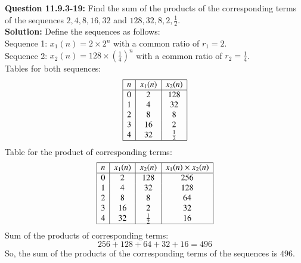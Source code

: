 \documentclass[journal,12pt,twocolumn]{IEEEtran}
\theoremstyle{remark}
\begin{document}
\title{}
\author{Sasa Mardi, EE23BTECH11222}
\date{}
\maketitle
\textbf{Question 11.9.3-19:} Find the sum of the products of the corresponding terms of the sequences $2, 4, 8, 16, 32$ and $128, 32, 8, 2, \frac{1}{2}$.\\
\textbf{Solution:}
Define the sequences as follows:\\
Sequence 1: \( x_1(n) = 2 \times 2^n \) with a common ratio of \( r_1 = 2 \).\\
Sequence 2: \( x_2(n) = 128 \times \left(\frac{1}{4}\right)^n \) with a common ratio of \( r_2 = \frac{1}{4}\).\\
Tables for both sequences:
\[
\begin{array}{|c|c|c|}
\hline
n & x_1(n) & x_2(n)\\
\hline
0 & 2 & 128 \\
1 & 4 & 32 \\
2 & 8 & 8 \\
3 & 16 & 2 \\
4 & 32 & \frac{1}{2} \\
\hline
\end{array}
\]
Table for the product of corresponding terms:
\[
\begin{array}{|c|c|c|c|}
\hline
n & x_1(n) & x_2(n) & x_1(n) \times x_2(n) \\
\hline
0 & 2 & 128 & 256 \\
1 & 4 & 32 & 128 \\
2 & 8 & 8 & 64 \\
3 & 16 & 2 & 32 \\
4 & 32 & \frac{1}{2} & 16 \\
\hline
\end{array}
\]
Sum of the products of corresponding terms:
\[
256 + 128 + 64 + 32 + 16 = 496
\]
So, the sum of the products of the corresponding terms of the sequences is \( 496 \).
\end{document}
